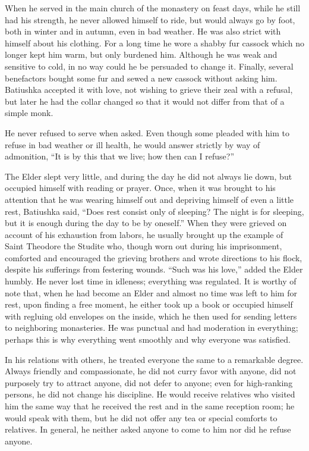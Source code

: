 When he served in the main church of the monastery on feast days, while he still had his strength, he never allowed himself to ride, but would always go by foot, both in winter and in autumn, even in bad weather. He was also strict with himself about his clothing. For a long time he wore a shabby fur cassock which no longer kept him warm, but only burdened him. Although he was weak and sensitive to cold, in no way could he be persuaded to change it. Finally, several benefactors bought some fur and sewed a new cassock without asking him. Batiushka accepted it with love, not wishing to grieve their zeal with a refusal, but later he had the collar changed so that it would not differ from that of a simple monk.

He never refused to serve when asked. Even though some pleaded with him to refuse in bad weather or ill health, he would answer strictly by way of admonition, ``It is by this that we live; how then can I refuse?''

The Elder slept very little, and during the day he did not always lie down, but occupied himself with reading or prayer. Once, when it was brought to his attention that he was wearing himself out and depriving himself of even a little rest, Batiushka said, ``Does rest consist only of sleeping? The night is for sleeping, but it is enough during the day to be by oneself.'' When they were grieved on account of his exhaustion from labors, he usually brought up the example of Saint Theodore the Studite who, though worn out during his imprisonment, comforted and encouraged the grieving brothers and wrote directions to his flock, despite his sufferings from festering wounds. ``Such was his love,'' added the Elder humbly. He never lost time in idleness; everything was regulated. It is worthy of note that, when he had become an Elder and almost no time was left to him for rest, upon finding a free moment, he either took up a book or occupied himself with regluing old envelopes on the inside, which he then used for sending letters to neighboring monasteries. He was punctual and had moderation in everything; perhaps this is why everything went smoothly and why everyone was satisfied.

In his relations with others, he treated everyone the same to a remarkable degree. Always friendly and compassionate, he did not curry favor with anyone, did not purposely try to attract anyone, did not defer to anyone; even for high-ranking persons, he did not change his discipline. He would receive relatives who visited him the same way that he received the rest and in the same reception room; he would speak with them, but he did not offer any tea or special comforts to relatives. In general, he neither asked anyone to come to him nor did he refuse anyone.

